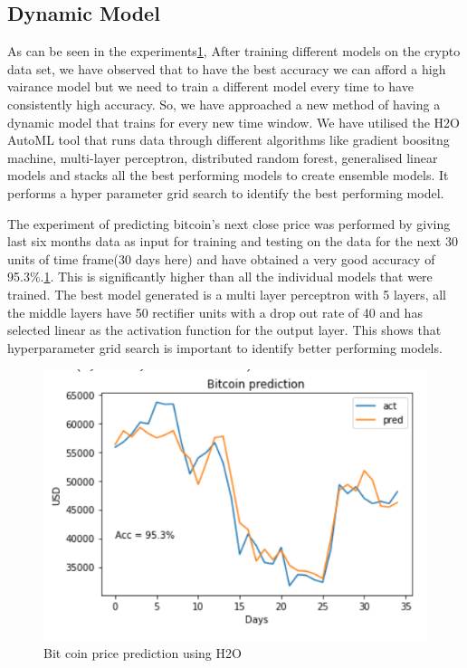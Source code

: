 \documentclass[final]{cvpr}
\begin{document}
 
 
 \subsection{Dynamic Model}
 
 As can be seen in the experiments\ref{fig:h2obtc}, After training different models on the crypto data set, we have observed that to have the best accuracy we can afford a high vairance model but we need to train a different model every time to have consistently high accuracy. So, we have approached a new method of having a dynamic model that trains for every new time window. We have utilised the H2O AutoML tool that runs data through different algorithms like gradient boositng machine, multi-layer perceptron, distributed random forest, generalised linear models and stacks all the best performing models to create ensemble models. It performs a hyper parameter grid search to identify the best performing model. 
 
 The experiment of predicting bitcoin's next close price was performed by giving last six months data as input for training and testing on the data for the next 30 units of time frame(30 days here) and have obtained a very good accuracy of 95.3\%.\ref{fig:h2obtc}. This is significantly higher than all the individual models that were trained. The best model generated is a multi layer perceptron with 5 layers, all the middle layers have 50 rectifier units with a drop out rate of 40 and has selected linear as the activation function for the output layer. This shows that hyperparameter grid search is important to identify better performing models.
 
\begin{figure}[h!]
\begin{center}
\caption{Bit coin price prediction using H2O}
\includegraphics[width=0.8\linewidth]{latex/H2O_btc.PNG}
\end{center}
\label{fig:h2obtc}
\end{figure}
 
\end{document}
